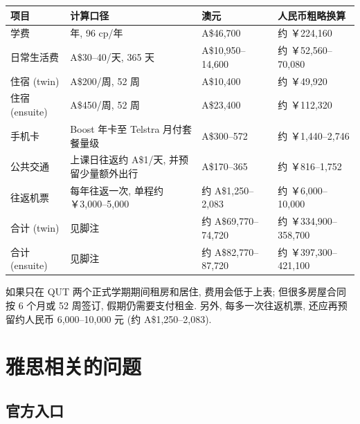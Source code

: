\documentclass{jit-qut}
\begin{document}
\scriptsize
\renewcommand{\arraystretch}{1.15}
\begin{longtable}{@{}>{\raggedright\arraybackslash}p{}>{\raggedright\arraybackslash}p{}>{\raggedright\arraybackslash}p{}>{\raggedright\arraybackslash}p{}@{}}
\toprule
项目 & 计算口径 & 澳元 & 人民币粗略换算\footnotemark \\
\midrule
\endhead
\bottomrule
\endfoot
学费 & 2027 年, 96 cp/年 & A\$46,700 & 约 ￥224,160 \\
日常生活费 & A\$30--40/天, 365 天 & A\$10,950--14,600 & 约 ￥52,560--70,080 \\
住宿 (twin) & A\$200/周, 52 周 & A\$10,400 & 约 ￥49,920 \\
住宿 (ensuite) & A\$450/周, 52 周 & A\$23,400 & 约 ￥112,320 \\
手机卡 & Boost 年卡至 Telstra 月付套餐量级 & A\$300--572 & 约 ￥1,440--2,746 \\
公共交通 & 上课日往返约 A\$1/天, 并预留少量额外出行 & A\$170--365 & 约 ￥816--1,752 \\
往返机票 & 每年往返一次, 单程约 ￥3,000--5,000 & 约 A\$1,250--2,083 & 约 ￥6,000--10,000 \\
\midrule
合计 (twin) & 见脚注\footnotemark[7] & 约 A\$69,770--74,720 & 约 ￥334,900--358,700 \\
合计 (ensuite) & 见脚注\footnotemark[8] & 约 A\$82,770--87,720 & 约 ￥397,300--421,100 \\
\end{longtable} 
\setcounter{footnote}{8}
\normalsize

如果只在 QUT 两个正式学期期间租房和居住, 费用会低于上表; 但很多房屋合同按 6 个月或 52 周签订, 假期仍需要支付租金. 另外, 每多一次往返机票, 还应再预留约人民币 6,000--10,000 元 (约 A\$1,250--2,083).

\newpage
\section{雅思相关的问题}

\subsection{官方入口}
\end{document}
